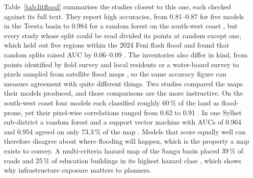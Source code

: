 \documentclass[10pt,a4paper,twocolumn]{article}
\begin{document}
Table~\ref{tab:litflood} summarises the studies closest to this one, each checked against its full text. They report high accuracies, from 0.81--0.87 for five models in the Teesta basin \citep{islam2021} to 0.984 for a random forest on the south-west coast \citep{adnan2023}, but every study whose split could be read divided its points at random except one, which held out five regions within the 2024 Feni flash flood and found that random splits raised AUC by 0.06--0.09 \citep{diptho2026}. The inventories also differ in kind, from points identified by field survey and local residents \citep{islam2021, talukdar2020} or a water-board survey \citep{rudra2023} to pixels sampled from satellite flood maps \citep{islamr2024, adnan2023, diptho2026}, so the same accuracy figure can measure agreement with quite different things. Two studies compared the maps their models produced, and those comparisons are the more instructive. On the south-west coast four models each classified roughly 60\,\% of the land as flood-prone, yet their pixel-wise correlations ranged from 0.62 to 0.91 \citep{adnan2023}. In one Sylhet sub-district a random forest and a support vector machine with AUCs of 0.964 and 0.954 agreed on only 73.3\,\% of the map \citep{islamr2024}. Models that score equally well can therefore disagree about where flooding will happen, which is the property a map exists to convey. A multi-criteria hazard map of the Sangu basin placed 39\,\% of roads and 25\,\% of education buildings in its highest hazard class \citep{zzaman2021}, which shows why infrastructure exposure matters to planners.
\end{document}
